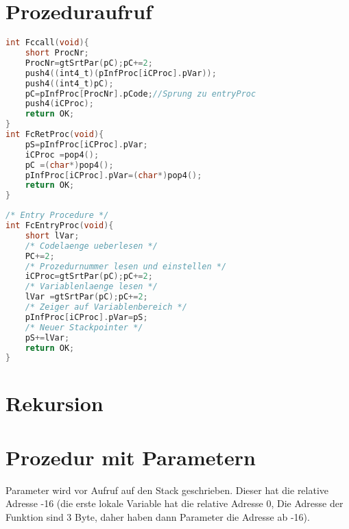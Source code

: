 \section{Prozeduraufruf}
\begin{lstlisting}[language=C]
int Fccall(void){
	short ProcNr;
	ProcNr=gtSrtPar(pC);pC+=2;
	push4((int4_t)(pInfProc[iCProc].pVar));
	push4((int4_t)pC);
	pC=pInfProc[ProcNr].pCode;//Sprung zu entryProc
	push4(iCProc);
	return OK;
}
int FcRetProc(void){
	pS=pInfProc[iCProc].pVar;
	iCProc =pop4();
	pC =(char*)pop4();
	pInfProc[iCProc].pVar=(char*)pop4();
	return OK;
}
\end{lstlisting}
\begin{lstlisting}[language=C]
/* Entry Procedure */
int FcEntryProc(void){
	short lVar;
	/* Codelaenge ueberlesen */
	PC+=2;
	/* Prozedurnummer lesen und einstellen */
	iCProc=gtSrtPar(pC);pC+=2;
	/* Variablenlaenge lesen */
	lVar =gtSrtPar(pC);pC+=2;
	/* Zeiger auf Variablenbereich */
	pInfProc[iCProc].pVar=pS;
	/* Neuer Stackpointer */
	pS+=lVar;
	return OK;
}
\end{lstlisting}

\section{Rekursion}

\section{Prozedur mit Parametern}
Parameter wird vor Aufruf auf den Stack geschrieben. Dieser hat die relative Adresse -16 (die erste lokale Variable hat die relative Adresse 0, Die Adresse der Funktion sind 3 Byte, daher haben dann Parameter die Adresse ab -16).

